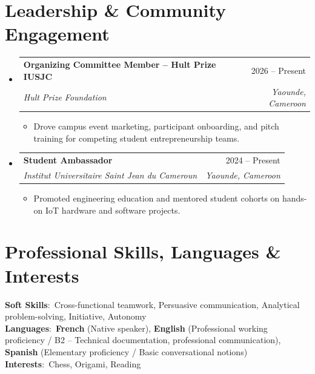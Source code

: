 \documentclass[letterpaper,10pt]{article}
\makeatletter
\newcommand{\resumeItem}[1]{
  \item\small{
    {#1 \vspace{-1.5pt}}
  }
}
\newcommand{\resumeSubheading}[4]{
  \vspace{-1pt}\item
    \begin{tabular*}{0.98\textwidth}[t]{l@{\extracolsep{\fill}}r}
      \textbf{#1} & #2 \\
      \textit{\small#3} & \textit{\small #4} \\
    \end{tabular*}\vspace{-5pt}
}
\newcommand{\resumeSubHeadingListStart}{\begin{itemize}[leftmargin=0.15in, label={}]}
\newcommand{\resumeSubHeadingListEnd}{\end{itemize}}
\newcommand{\resumeItemListStart}{\begin{itemize}[leftmargin=0.2in, label={$\vcenter{\hbox{\tiny$\bullet$}}$}, itemsep=1.2pt, parsep=0pt]}
\newcommand{\resumeItemListEnd}{\end{itemize}\vspace{-3pt}}
\makeatother
\begin{document}
\section{Leadership \& Community Engagement}
  \resumeSubHeadingListStart
    \resumeSubheading
      {Organizing Committee Member -- Hult Prize IUSJC}{2026 -- Present}
      {Hult Prize Foundation}{Yaounde, Cameroon}
      \resumeItemListStart
        \resumeItem{Drove campus event marketing, participant onboarding, and pitch training for competing student entrepreneurship teams.}
      \resumeItemListEnd
    \resumeSubheading
      {Student Ambassador}{2024 -- Present}
      {Institut Universitaire Saint Jean du Cameroun}{Yaounde, Cameroon}
      \resumeItemListStart
        \resumeItem{Promoted engineering education and mentored student cohorts on hands-on IoT hardware and software projects.}
      \resumeItemListEnd
  \resumeSubHeadingListEnd

\section{Professional Skills, Languages \& Interests}
\begin{itemize}[leftmargin=0.15in, label={}]
    \small{\item{
     \textbf{Soft Skills}{:\ Cross-functional teamwork, Persuasive communication, Analytical problem-solving, Initiative, Autonomy} \\ \vspace{1.5pt}
     \textbf{Languages}{:\ \textbf{French} (Native speaker), \textbf{English} (Professional working proficiency / B2 -- Technical documentation, professional communication), \textbf{Spanish} (Elementary proficiency / Basic conversational notions)} \\ \vspace{1.5pt}
     \textbf{Interests}{:\ Chess, Origami, Reading}
    }}
\end{itemize}

\end{document}
